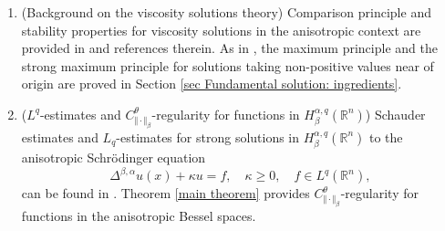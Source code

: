 \documentclass[10pt, leqno]{article}
\theoremstyle{definition}
\theoremstyle{remark}
\numberwithin{equation}{section}
\begin{document}
\begin{enumerate}
\begin{eqnarray}
\Delta^{\beta,\alpha} u_{\gamma} \geq 1 \quad \text{on}\  \partial \Theta^{\mu \beta}_{1}, \quad \text{for all} \ \alpha_{0} < \alpha < 2/b_{\max},
\end{eqnarray}
see Lemma \ref{barrier lemma lemma 1} in Section \ref{sec Fundamental solution: ingredients}.
\item(Background on the viscosity solutions theory) Comparison principle and stability properties for viscosity solutions in the anisotropic context are provided in \cite{CLU, SL} and references therein. As in \cite{CWW}, the maximum principle and the strong maximum principle for solutions taking non-positive values near of origin are proved in Section \ref{sec Fundamental solution: ingredients}.

\item($L^{q}$-estimates and $C_{\Vert \cdot \Vert_{\beta}}^{\theta}$-regularity for functions in $H^{\alpha, q}_{\beta}\left( \mathbb{R}^{n}\right)$) Schauder estimates and $L_{q}$-estimates for strong solutions in $H^{\alpha, q}_{\beta}\left( \mathbb{R}^{n}\right)$ to the anisotropic Schr\" odinger equation
$$
\Delta^{\beta, \alpha}u (x) + \kappa u = f, \quad \kappa \geq 0, \quad f \in L^{q}\left( \mathbb{R}^{n}\right),
$$
can be found in \cite{LEITAO LP}. Theorem \ref{main theorem} provides $C_{\Vert \cdot \Vert_{\beta}}^{\theta}$-regularity for functions in the anisotropic Bessel spaces.

\end{enumerate}
\end{document}
